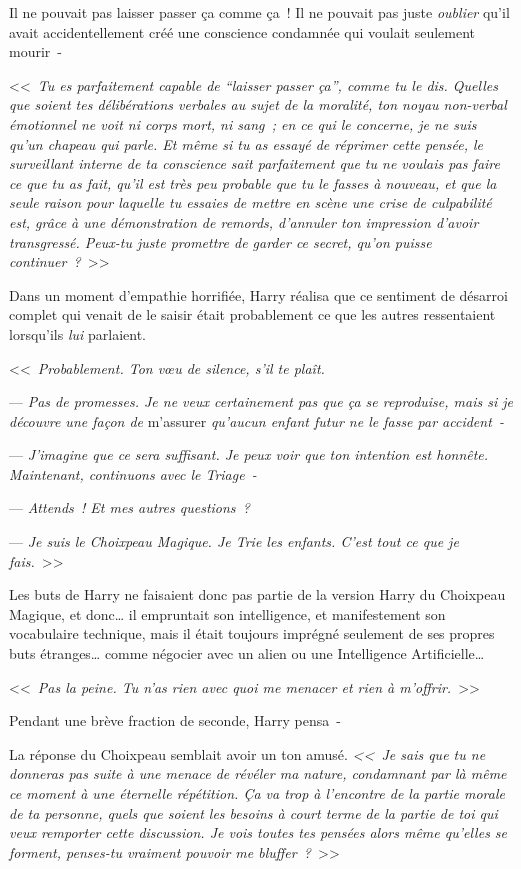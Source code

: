 Il ne pouvait pas laisser passer ça comme ça~! Il ne pouvait pas juste \emph{oublier} qu'il avait accidentellement créé une conscience condamnée qui voulait seulement mourir~-

<<~\emph{Tu es parfaitement capable de “laisser passer ça”, comme tu le dis. Quelles que soient tes délibérations verbales au sujet de la moralité, ton noyau non-verbal émotionnel ne voit ni corps mort, ni sang~; en ce qui le concerne, je ne suis qu'un chapeau qui parle. Et même si tu as essayé de réprimer cette pensée, le surveillant interne de ta conscience sait parfaitement que tu ne voulais pas faire ce que tu as fait, qu'il est très peu probable que tu le fasses à nouveau, et que la seule raison pour laquelle tu essaies de mettre en scène une crise de culpabilité est, grâce à une démonstration de remords, d'annuler ton impression d'avoir transgressé. Peux-tu juste promettre de garder ce secret, qu'on puisse continuer~?}~>>

Dans un moment d'empathie horrifiée, Harry réalisa que ce sentiment de désarroi complet qui venait de le saisir était probablement ce que les autres ressentaient lorsqu'ils \emph{lui} parlaient.

<<~\emph{Probablement. Ton vœu de silence, s'il te plaît.}

--- \emph{Pas de promesses. Je ne veux certainement pas que ça se reproduise, mais si je découvre une façon de} m'assurer \emph{qu'aucun enfant futur ne le fasse par accident~-}

--- \emph{J'imagine que ce sera suffisant. Je peux voir que ton intention est honnête. Maintenant, continuons avec le Triage~-}

--- \emph{Attends~! Et mes autres questions~?}

--- \emph{Je suis le Choixpeau Magique. Je Trie les enfants. C'est tout ce que je fais.}~>>

Les buts de Harry ne faisaient donc pas partie de la version Harry du Choixpeau Magique, et donc… il empruntait son intelligence, et manifestement son vocabulaire technique, mais il était toujours imprégné seulement de ses propres buts étranges… comme négocier avec un alien ou une Intelligence Artificielle…

<<~\emph{Pas la peine. Tu n'as rien avec quoi me menacer et rien à m'offrir.}~>>

Pendant une brève fraction de seconde, Harry pensa~-

La réponse du Choixpeau semblait avoir un ton amusé. \emph{<<~Je sais que tu ne donneras pas suite à une menace de révéler ma nature, condamnant par là même ce moment à une éternelle répétition. Ça va trop à l'encontre de la partie morale de ta personne, quels que soient les besoins à court terme de la partie de toi qui veux remporter cette discussion. Je vois toutes tes pensées alors même qu'elles se forment, penses-tu vraiment pouvoir me bluffer~?}~>>

